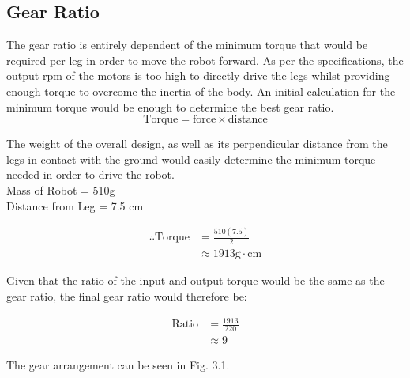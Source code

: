   \subsection{Gear Ratio}
  \label{sub:Gear Ratio}
    The gear ratio is entirely dependent of the minimum torque that would be required per leg in order to move the robot forward. As per the specifications, the output rpm of the motors is too high to directly drive the legs whilst providing enough torque to overcome the inertia of the body. An initial calculation for the minimum torque would be enough to determine the best gear ratio.\\

    \begin{equation}
      \text{Torque} = \text{force}\times\text{distance}
    \end{equation}

    The weight of the overall design, as well as its perpendicular distance from the legs in contact with the ground would easily determine the minimum torque needed in order to drive the robot. \\

    Mass of Robot = 510g \\
    Distance from Leg = 7.5 cm

    \begin{equation*}
      \begin{split}
        \therefore \text{Torque} &= \frac{510\left(7.5\right)}{2}\\
                                 &\approx 1913 \text{g}\cdot\text{cm}
      \end{split}
    \end{equation*}

    Given that the ratio of the input and output torque would be the same as the gear ratio, the final gear ratio would therefore be:

    \begin{equation*}
      \begin{split}
        \text{Ratio} &= \frac{1913}{220} \\
                     &\approx 9
      \end{split}
    \end{equation*}

    The gear arrangement can be seen in Fig. 3.1.

